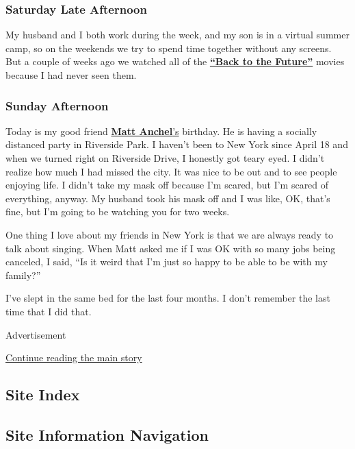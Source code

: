 \hypertarget{saturday-late-afternoon}{%
\subsubsection{\texorpdfstring{\textbf{Saturday Late
Afternoon}}{Saturday Late Afternoon}}\label{saturday-late-afternoon}}

My husband and I both work during the week, and my son is in a virtual
summer camp, so on the weekends we try to spend time together without
any screens. But a couple of weeks ago we watched all of the
\textbf{\href{https://www.backtothefuture.com/}{``Back to the Future''}}
movies because I had never seen them.

\hypertarget{sunday-afternoon}{%
\subsubsection{\texorpdfstring{\textbf{Sunday
Afternoon}}{Sunday Afternoon}}\label{sunday-afternoon}}

Today is my good friend
\textbf{\href{https://www.matthewanchel.com/}{Matt
Anchel}}\href{https://www.matthewanchel.com/}{'s} birthday. He is having
a socially distanced party in Riverside Park. I haven't been to New York
since April 18 and when we turned right on Riverside Drive, I honestly
got teary eyed. I didn't realize how much I had missed the city. It was
nice to be out and to see people enjoying life. I didn't take my mask
off because I'm scared, but I'm scared of everything, anyway. My husband
took his mask off and I was like, OK, that's fine, but I'm going to be
watching you for two weeks.

One thing I love about my friends in New York is that we are always
ready to talk about singing. When Matt asked me if I was OK with so many
jobs being canceled, I said, ``Is it weird that I'm just so happy to be
able to be with my family?''

I've slept in the same bed for the last four months. I don't remember
the last time that I did that.

Advertisement

\protect\hyperlink{after-bottom}{Continue reading the main story}

\hypertarget{site-index}{%
\subsection{Site Index}\label{site-index}}

\hypertarget{site-information-navigation}{%
\subsection{Site Information
Navigation}\label{site-information-navigation}}

